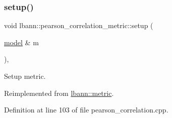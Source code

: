 \mbox{\label{classlbann_1_1pearson__correlation__metric_a4394c0ebb3cacdcec934e4ae322f9bb6}} 
\subsubsection{\texorpdfstring{setup()}{setup()}}
{\footnotesize\ttfamily void lbann\+::pearson\+\_\+correlation\+\_\+metric\+::setup (\begin{DoxyParamCaption}\item[{\hyperlink{classlbann_1_1model}{model} \&}]{m }\end{DoxyParamCaption})\hspace{0.3cm}{\ttfamily [override]}, {\ttfamily [virtual]}}

Setup metric. 

Reimplemented from \hyperlink{classlbann_1_1metric_a898d23e410297378db2fe9f8d1754fe0}{lbann\+::metric}.



Definition at line 103 of file pearson\+\_\+correlation.\+cpp.


